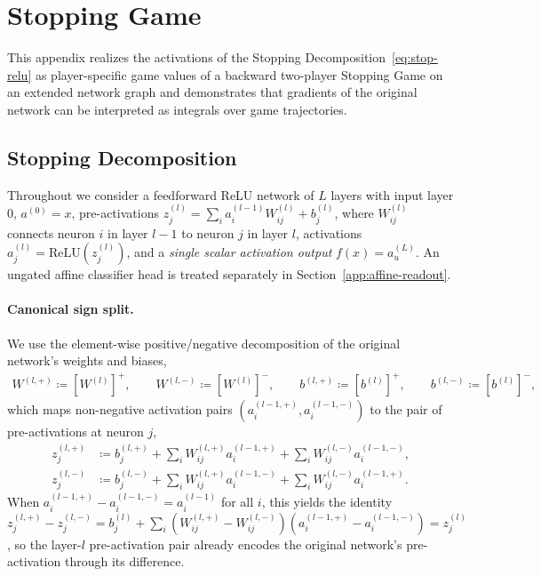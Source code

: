 \documentclass[twoside]{article}
\newcommand{\relu}{\text{ReLU}}
\newcommand{\1}{\mathbf{1}}
\begin{document}
\section{Stopping Game}\label{app:relu-net-game}\label{app:adf-game}

This appendix realizes the activations of the Stopping Decomposition~\eqref{eq:stop-relu} as
player-specific game values of a backward two-player Stopping Game on an extended network graph and
demonstrates that gradients of the original network can be interpreted as integrals over game
trajectories.

\subsection{Stopping Decomposition}\label{app:dc-decomp}\label{app:decompositions}

Throughout we consider a feedforward ReLU network of $L$ layers with input layer $0$, $a^{(0)} =
    x$, pre-activations $z_j^{(l)} = \sum_i a_i^{(l-1)} W_{ij}^{(l)} + b_j^{(l)}$, where $W_{ij}^{(l)}$
connects neuron $i$ in layer $l-1$ to neuron $j$ in layer $l$, activations $a_j^{(l)} =
    \relu(z_j^{(l)})$, and a \emph{single scalar activation output} $f(x) = a_u^{(L)}$.
An ungated affine classifier head is treated separately in Section~\ref{app:affine-readout}.

\paragraph{Canonical sign split.}
We use the element-wise positive/negative decomposition of the original network's weights and
biases,
\begin{align}
    W^{(l,+)} \coloneqq [W^{(l)}]^+, \qquad W^{(l,-)} \coloneqq [W^{(l)}]^-, \qquad b^{(l,+)} \coloneqq
    [b^{(l)}]^+, \qquad b^{(l,-)} \coloneqq [b^{(l)}]^-,
\end{align}
which maps non-negative activation pairs $(a_i^{(l-1,+)}, a_i^{(l-1,-)})$ to the pair of
pre-activations at neuron $j$,
\begin{align}
    z_j^{(l,+)} &\coloneqq b_j^{(l,+)} + \sum_i W_{ij}^{(l,+)} a_i^{(l-1,+)} + \sum_i W_{ij}^{(l,-)}
    a_i^{(l-1,-)}, \label{eq:split-pos}\\
    z_j^{(l,-)} &\coloneqq b_j^{(l,-)} + \sum_i W_{ij}^{(l,+)} a_i^{(l-1,-)} + \sum_i W_{ij}^{(l,-)}
    a_i^{(l-1,+)}. \label{eq:split-neg}
\end{align}
When $a_i^{(l-1,+)} - a_i^{(l-1,-)} = a_i^{(l-1)}$ for all $i$, this yields the identity
$z_j^{(l,+)} - z_j^{(l,-)} = b_j^{(l)} + \sum_i (W_{ij}^{(l,+)} - W_{ij}^{(l,-)}) (a_i^{(l-1,+)} -
    a_i^{(l-1,-)}) = z_j^{(l)}$, so the layer-$l$ pre-activation pair already encodes the original
network's pre-activation through its difference.
\end{document}
